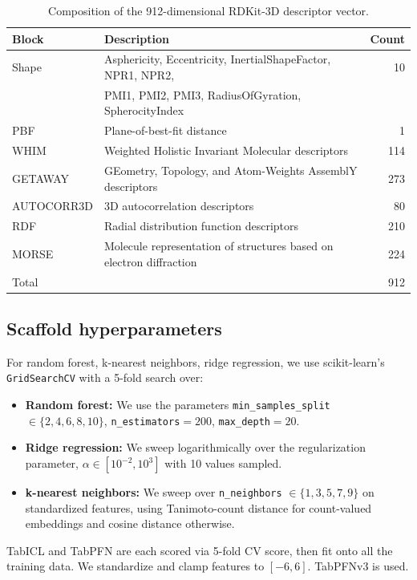 \documentclass{article}
\begin{document}
\begin{table}[H]
\centering
\caption{Composition of the 912-dimensional RDKit-3D descriptor vector.}
\label{tab:rdkit3d}
\begin{tabular}{llr}
\toprule
Block & Description & Count \\
\midrule
Shape & Asphericity, Eccentricity, InertialShapeFactor, NPR1, NPR2, & 10 \\
      & PMI1, PMI2, PMI3, RadiusOfGyration, SpherocityIndex & \\
PBF & Plane-of-best-fit distance & 1 \\
WHIM & Weighted Holistic Invariant Molecular descriptors & 114 \\
GETAWAY & GEometry, Topology, and Atom-Weights AssemblY descriptors & 273 \\
AUTOCORR3D & 3D autocorrelation descriptors & 80 \\
RDF & Radial distribution function descriptors & 210 \\
MORSE & Molecule representation of structures based on electron diffraction & 224 \\
\midrule
Total & & 912 \\
\bottomrule
\end{tabular}
\end{table}


\subsection{Scaffold hyperparameters}
For random forest, k-nearest neighbors, ridge regression, we use scikit-learn's \texttt{GridSearchCV} \citep{pedregosa2011} with a 5-fold search over:
\begin{itemize}
    \item \textbf{Random forest:} We use the parameters \texttt{min\_samples\_split} $\in \{2,4,6,8,10\}$, \texttt{n\_estimators}$=200$, \texttt{max\_depth}$=20$.
    \item \textbf{Ridge regression:} We sweep logarithmically over the regularization parameter, $\alpha \in [10^{-2}, 10^{3}]$ with 10 values sampled.
    \item \textbf{k-nearest neighbors:} We sweep over \texttt{n\_neighbors} $\in \{1,3,5,7,9\}$ on standardized features, using Tanimoto-count distance for count-valued embeddings and cosine distance otherwise.
\end{itemize}

TabICL and TabPFN are each scored via 5-fold CV score, then fit onto all the training data. We standardize and clamp features to $[-6, 6]$. TabPFNv3 \citep{tabpfn3} is used.
\end{document}
